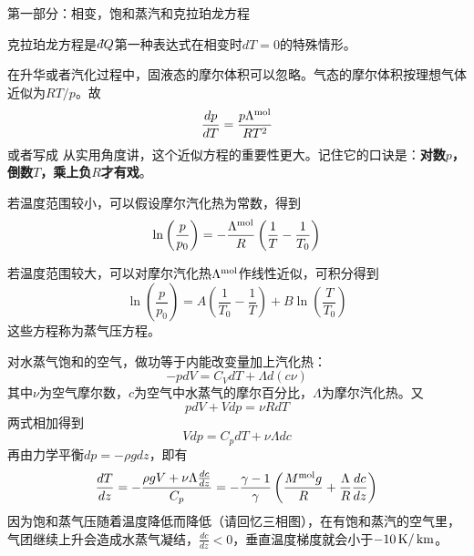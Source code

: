 \documentclass[CJK]{beamer}
\begin{document}
\begin{frame}
  \bch
  {\Huge 第一部分：相变，饱和蒸汽和克拉珀龙方程}
  \ech
\end{frame}


\begin{frame}
  \bch
  \emini
  克拉珀龙方程是$\dbar Q$第一种表达式在相变时$dT=0$的特殊情形。
  \emini
  
  \ech
\end{frame}

\begin{frame}
  \bch
  在升华或者汽化过程中，固液态的摩尔体积可以忽略。气态的摩尔体积按理想气体近似为$RT/p$。故
  $$ \frac{dp}{dT} = \frac{p\Lambda^{\rm mol}}{RT^2}$$
  或者写成
  从实用角度讲，这个近似方程的重要性更大。记住它的口诀是：{\bf 对数$p$，倒数$T$，乘上负$R$才有戏}。
  \ech
\end{frame}


\begin{frame}
  \bch
  \bitem
  \item{
  若温度范围较小，可以假设摩尔汽化热为常数，得到
  $$\ln\left(\frac{p}{p_0}\right) = -\frac{\Lambda^{\rm mol}}{R}\left(\frac{1}{T}-\frac{1}{T_0}\right)$$
  }
  \item{若温度范围较大，可以对摩尔汽化热$\Lambda^{\rm mol}$作线性近似，可积分得到
    $$\ln\left(\frac{p}{p_0}\right) = A \left(\frac{1}{T_0} - \frac{1}{T}\right) + B \ln\left(\frac{T}{T_0}\right)$$}
    \eitem
  这些方程称为蒸气压方程。
  \ech
\end{frame}

\begin{frame}
\bch
{\small
对水蒸气饱和的空气，做功等于内能改变量加上汽化热：
$$ -pdV = C_V dT + \Lambda d(c\nu) $$
其中$\nu$为空气摩尔数，$c$为空气中水蒸气的摩尔百分比，$\Lambda$为摩尔汽化热。又
$$pdV + Vdp = \nu R dT$$
两式相加得到
$$ Vdp = C_p  dT + \nu \Lambda dc $$
再由力学平衡$ dp = -\rho g dz$，即有
$$ \frac{dT}{dz} =-\frac{\rho g V + \nu\Lambda\frac{dc}{dz}}{C_p} = -\frac{\gamma-1}{\gamma}\left(\frac{M^{\rm mol}g}{R}+\frac{\Lambda}{R}\frac{dc}{dz}\right)$$
因为饱和蒸气压随着温度降低而降低（请回忆三相图），在有饱和蒸汽的空气里，气团继续上升会造成水蒸气凝结，$ \frac{dc}{dz} < 0 $，垂直温度梯度就会小于$-10\,\mathrm{K}/\,\mathrm{km}$。
}
\ech
\end{frame}
\end{document}
